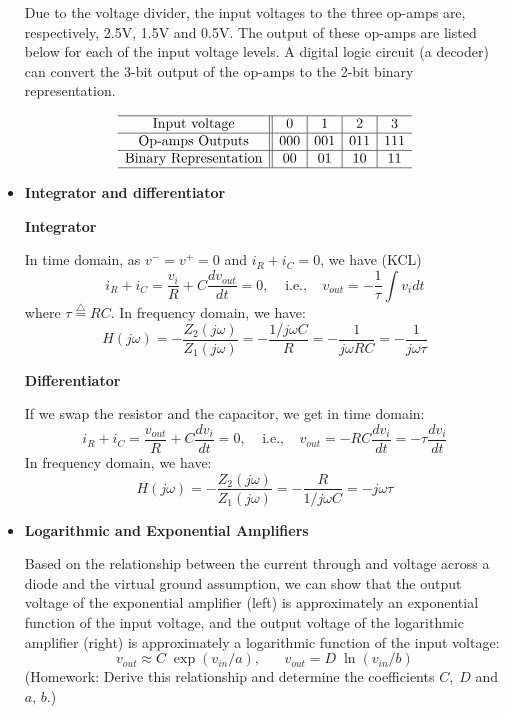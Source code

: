 \begin{itemize}

  Due to the voltage divider, the input voltages to the three op-amps are, 
  respectively, 2.5V, 1.5V and 0.5V. The output of these op-amps are listed
  below for each of the input voltage levels. A digital logic circuit (a
  decoder) can convert the 3-bit output of the op-amps to the 2-bit binary 
  representation.

  \[
  \begin{array}{c||c|c|c|c}\hline
    \mbox{Input voltage}        & 0 	& 1	& 2	& 3	\\\hline
    \mbox{Op-amps Outputs}	& 000	& 001	& 011	& 111	\\\hline
    \mbox{Binary Representation}	& 00	& 01	& 10	& 11	\\ \hline
  \end{array}
  \]


\item {\bf Integrator and differentiator}


  {\bf Integrator}

  In time domain, as $v^-=v^+=0$ and $i_R+i_C=0$, we have (KCL)
  \[
  i_R+i_C=\frac{v_i}{R}+C\frac{d v_{out}}{dt}=0,
  \;\;\;\; \mbox{i.e.,}\;\;\;\;v_{out}=-\frac{1}{\tau} \int v_i dt	
  \]
  where $\tau \stackrel{\triangle}{=}RC$. In frequency domain, we have:
  \[
  H(j\omega)=-\frac{Z_2(j\omega)}{Z_1(j\omega)}=-\frac{1/j\omega C}{R}
  =-\frac{1}{j\omega RC}=-\frac{1}{j\omega \tau}	
  \]

  {\bf Differentiator}

  If we swap the resistor and the capacitor, we get in time domain:
  \[ 
  i_R+i_C=\frac{v_{out}}{R}+C\frac{d v_i}{dt}=0,\;\;\;\;
  \mbox{i.e.,}\;\;\;\;v_{out}=-RC \frac{d v_i}{dt}=-\tau \frac{d v_i}{dt}	
  \]
  In frequency domain, we have:
  \[ 
  H(j\omega)=-\frac{Z_2(j\omega)}{Z_1(j\omega)}=-\frac{R}{1/j\omega C}
  =-j\omega \tau 
  \]

\item {\bf Logarithmic and Exponential Amplifiers}


  Based on the relationship between the current through and voltage 
  across a diode and the virtual ground assumption, we can show 
  that the output voltage of the exponential amplifier (left) is
  approximately an exponential function of the input voltage, and 
  the output voltage of the logarithmic amplifier (right) is 
  approximately a logarithmic function of the input voltage:
  \[
  v_{out}\approx C \;\exp(v_{in}/a),\;\;\;\;\;\; v_{out}= D\; \ln (v_{in}/b)
  \]
  (Homework: Derive this relationship and determine the coefficients 
  $C,\;D$ and $a,\,b$.)


\end{itemize}
